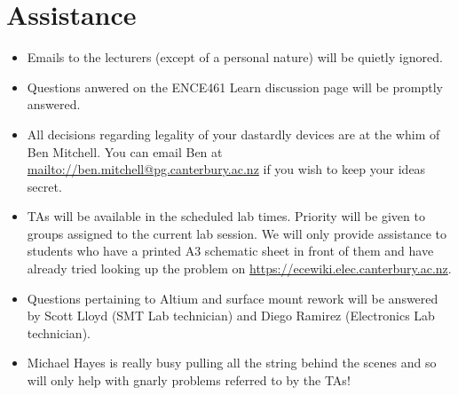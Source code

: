 \documentclass[11pt, a4paper]{article}
\begin{document}
\section{Assistance}


\begin{itemize}
\item Emails to the lecturers (except of a personal nature) will be
  quietly ignored.

\item Questions anwered on the ENCE461 Learn discussion page will be
  promptly answered.

\item All decisions regarding legality of your dastardly devices are
  at the whim of Ben Mitchell.  You can email Ben at
  \url{mailto://ben.mitchell@pg.canterbury.ac.nz} if you wish to keep
  your ideas secret.

\item TAs will be available in the scheduled lab times.  Priority will
  be given to groups assigned to the current lab session.  We will
  only provide assistance to students who have a printed A3 schematic
  sheet in front of them and have already tried looking up the problem
  on \url{https://ecewiki.elec.canterbury.ac.nz}.

\item Questions pertaining to Altium and surface mount rework will be
  answered by Scott Lloyd (SMT Lab technician) and Diego Ramirez
  (Electronics Lab technician).

\item Michael Hayes is really busy pulling all the string behind the
  scenes and so will only help with gnarly problems referred to by the
  TAs!
  
\end{itemize}
\end{document}
